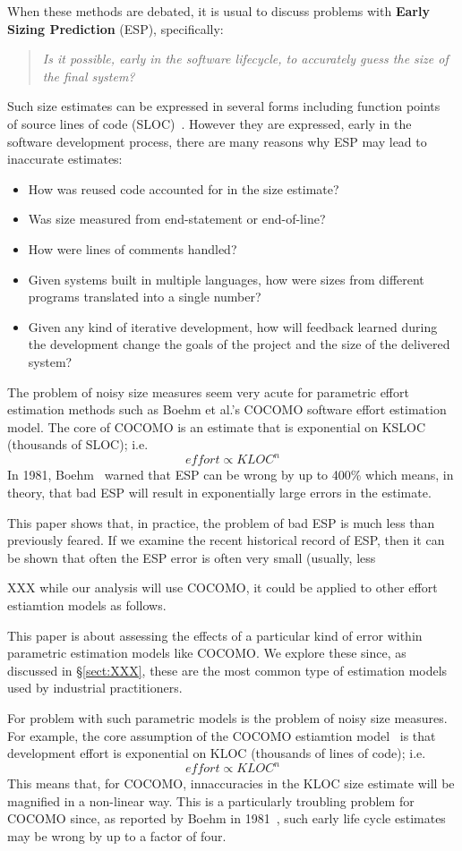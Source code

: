 \documentclass[final,twocolumn,5p]{elsarticle}
\newcommand{\bi}{\begin{itemize}[leftmargin=0.4cm]}
\newcommand{\ei}{\end{itemize}}
\newcommand{\tion}[1]{\S\ref{sect:#1}}
\begin{document}
When these methods are debated, it is usual to discuss problems with {\bf Early Sizing Prediction} (ESP),
specifically:
\begin{quote}
 {\em Is it possible, early in the software lifecycle,
    to accurately guess the size of the final system?}
  \end{quote}
Such size estimates can be expressed in several
forms including function points~\cite{Albrecht83} of  source lines of code (SLOC)~\cite{boehm81}.
However they are expressed, early in the software development process,
there are many reasons why ESP may lead to inaccurate estimates:
\bi
\item How was reused code accounted for in the size estimate?
\item  Was size measured from end-statement or end-of-line?
\item How were lines of comments handled?
\item Given systems built in multiple languages, how were sizes from different programs translated
  into a single number?
\item
  Given any kind of iterative development, how will feedback learned during the development change
  the goals of the project and the size of the delivered system?
  \ei
The  problem of noisy size measures seem very acute for parametric effort estimation
methods such as Boehm et al.'s COCOMO software effort estimation model.
The core of COCOMO  is an estimate that is exponential on KSLOC (thousands of SLOC); i.e.
\[
\mathit{effort} \propto \mathit{KLOC}^n
\]
In 1981, Boehm~\cite{hoem1981} warned that ESP can be wrong by up to 400\%
which means, in theory,  that bad ESP will result in exponentially large errors in the estimate.

This paper shows that, in practice, the problem of bad ESP is much less than previously feared.
If we examine the recent historical record of ESP, then it can be shown that often the ESP
error is often very small (usually, less 

XXX while our analysis will use COCOMO, it could be applied to other effort estiamtion models
as follows.

This paper is about assessing the effects of a particular kind of
error within parametric estimation models like COCOMO.
We explore these since, as discussed in \tion{XXX}, these are the most
common type of estimation models used by industrial practitioners.


For problem with such parametric models is the  problem of noisy size measures.
For example, 
the core assumption of the COCOMO  estiamtion model~\cite{boehm81,boehm00b}
is that development effort
is exponential on KLOC (thousands of lines of code); i.e.
\[
\mathit{effort} \propto \mathit{KLOC}^n
\]
This means that, for COCOMO,  innaccuracies in the 
KLOC size estimate will be magnified in a non-linear way. This is a particularly
troubling problem for COCOMO since, as reported by Boehm in 1981~\cite{boehm81},
such early life cycle estimates may be wrong by up to a factor of four.
\end{document}
